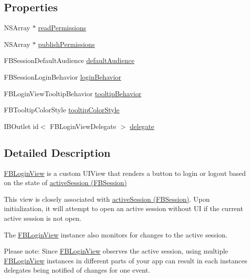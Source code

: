 \subsection*{Properties}
\begin{DoxyCompactItemize}
\item 
N\+S\+Array $\ast$ \hyperlink{interfaceFBLoginView_a37d330ba79d55dfb412e8f24c0d96a8b}{read\+Permissions}
\item 
N\+S\+Array $\ast$ \hyperlink{interfaceFBLoginView_a024435e287685d24b2691312fbe96200}{publish\+Permissions}
\item 
F\+B\+Session\+Default\+Audience \hyperlink{interfaceFBLoginView_a45fcbc4c198a06b34ed090d84d0fe24f}{default\+Audience}
\item 
F\+B\+Session\+Login\+Behavior \hyperlink{interfaceFBLoginView_aa9bf2f39b651809b2309803ea0d54bb1}{login\+Behavior}
\item 
F\+B\+Login\+View\+Tooltip\+Behavior \hyperlink{interfaceFBLoginView_a4a53052d99f7d52e483a20ef3c39b6c8}{tooltip\+Behavior}
\item 
F\+B\+Tooltip\+Color\+Style \hyperlink{interfaceFBLoginView_a4fa7e4f312b167278b88b4989b159af2}{tooltip\+Color\+Style}
\item 
I\+B\+Outlet id$<$ F\+B\+Login\+View\+Delegate $>$ \hyperlink{interfaceFBLoginView_abb654662b04ca4d0741b024870593d2e}{delegate}
\end{DoxyCompactItemize}


\subsection{Detailed Description}
\hyperlink{interfaceFBLoginView}{F\+B\+Login\+View} is a custom U\+I\+View that renders a button to login or logout based on the state of {\ttfamily \hyperlink{interfaceFBSession_aaf6863ab39e2f67733792453874d3870}{active\+Session (\+F\+B\+Session)}}

This view is closely associated with {\ttfamily \hyperlink{interfaceFBSession_aaf6863ab39e2f67733792453874d3870}{active\+Session (\+F\+B\+Session)}}. Upon initialization, it will attempt to open an active session without UI if the current active session is not open.

The \hyperlink{interfaceFBLoginView}{F\+B\+Login\+View} instance also monitors for changes to the active session.

Please note\+: Since \hyperlink{interfaceFBLoginView}{F\+B\+Login\+View} observes the active session, using multiple \hyperlink{interfaceFBLoginView}{F\+B\+Login\+View} instances in different parts of your app can result in each instance\textquotesingle{}s delegates being notified of changes for one event. 

